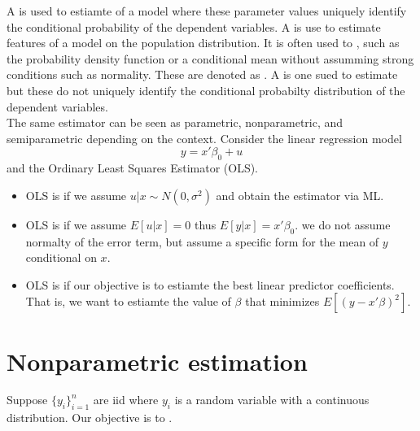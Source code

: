 \ChapterHeading

A  is used to estiamte  of a model where
these parameter values uniquely identify the conditional probability of the dependent variables. 
A  is use to estimate features of a model  on the population distribution.
It is often used to , such as the probability density function or a conditional mean without assumming strong conditions
such as normality. These are denoted as .
A  is one sued to estimate  but these do not uniquely identify the conditional probabilty distribution of the dependent variables.\\

The same estimator can be seen as parametric, nonparametric, and semiparametric depending on the context. Consider the linear regression model 
\begin{equation*}
    y = x'\beta_0+u
\end{equation*}
and the Ordinary Least Squares Estimator (OLS).
\begin{itemize}
    \item OLS is  if we assume $u|x\sim N(0,\sigma^2)$ and obtain the estimator via ML.
    \item OLS is  if we assume $E[u|x] = 0$ thus $E[y|x] = x'\beta_0$. we do not assume normalty of the error term, but assume a specific form for the mean of $y$ conditional on $x$.
    \item OLS is  if our objective is to estiamte the best linear predictor coefficients. That is, we want to estiamte the value of $\beta$ that minimizes $E[(y-x'\beta)^2]$.
\end{itemize}

\section{Nonparametric estimation}

Suppose $\{y_i\}_{i=1}^{n}$ are iid where $y_i$ is a random variable with a continuous distribution.
Our objective is to .

